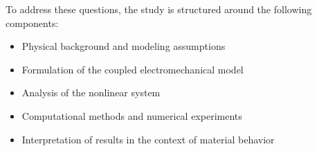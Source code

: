 To address these questions, the study is structured around the following components:

\begin{itemize}
    \item Physical background and modeling assumptions
    \item Formulation of the coupled electromechanical model
    \item Analysis of the nonlinear system
    \item Computational methods and numerical experiments
    \item Interpretation of results in the context of material behavior
\end{itemize}